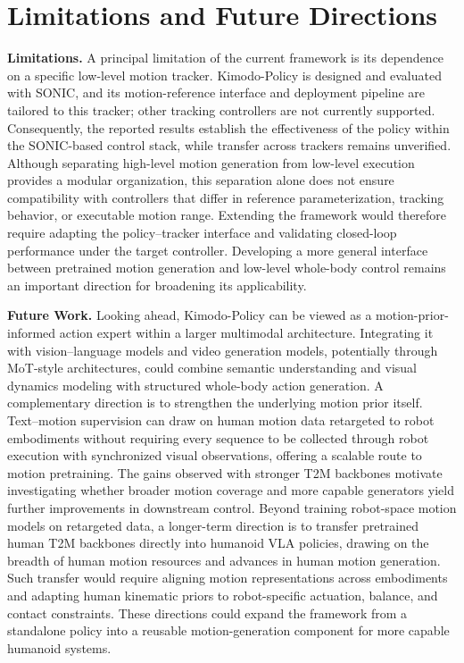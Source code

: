 \section{Limitations and Future Directions}
\label{sec:limitations_future}

\textbf{Limitations.} A principal limitation of the current framework is its dependence on a specific low-level motion tracker. Kimodo-Policy is designed and evaluated with SONIC, and its motion-reference interface and deployment pipeline are tailored to this tracker; other tracking controllers are not currently supported. Consequently, the reported results establish the effectiveness of the policy within the SONIC-based control stack, while transfer across trackers remains unverified. Although separating high-level motion generation from low-level execution provides a modular organization, this separation alone does not ensure compatibility with controllers that differ in reference parameterization, tracking behavior, or executable motion range. Extending the framework would therefore require adapting the policy–tracker interface and validating closed-loop performance under the target controller. Developing a more general interface between pretrained motion generation and low-level whole-body control remains an important direction for broadening its applicability.

\textbf{Future Work.} Looking ahead, Kimodo-Policy can be viewed as a motion-prior-informed action expert within a larger multimodal architecture. Integrating it with vision–language models and video generation models, potentially through MoT-style architectures, could combine semantic understanding and visual dynamics modeling with structured whole-body action generation. A complementary direction is to strengthen the underlying motion prior itself. Text–motion supervision can draw on human motion data retargeted to robot embodiments without requiring every sequence to be collected through robot execution with synchronized visual observations, offering a scalable route to motion pretraining. The gains observed with stronger T2M backbones motivate investigating whether broader motion coverage and more capable generators yield further improvements in downstream control. Beyond training robot-space motion models on retargeted data, a longer-term direction is to transfer pretrained human T2M backbones directly into humanoid VLA policies, drawing on the breadth of human motion resources and advances in human motion generation. Such transfer would require aligning motion representations across embodiments and adapting human kinematic priors to robot-specific actuation, balance, and contact constraints. These directions could expand the framework from a standalone policy into a reusable motion-generation component for more capable humanoid systems.